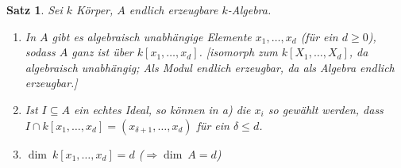 \documentclass[a4paper,12pt]{scrbook}
\theoremstyle{break}
\newtheorem{Satz}{Satz}
\theoremstyle{nonumberbreak}
\theoremstyle{nonumberplain}
\begin{document}
\begin{Satz}
\label{11}
Sei $k$ Körper, $A$ endlich erzeugbare $k$-Algebra.
\begin{enumerate}
\item In $A$ gibt es algebraisch unabhängige Elemente $x_1, \ldots, x_d$ (für ein
$d \geq 0$), sodass $A$ ganz ist über $k[x_1, \ldots, x_d]$. [isomorph zum 
$k[X_1,\ldots,X_d]$, da algebraisch unabhängig; Als Modul endlich erzeugbar,
da als Algebra endlich erzeugbar.]
\item Ist $I\subseteq A$ ein echtes Ideal, so können in a) die $x_i$ so
gewählt werden, dass $I\cap k[x_1, \ldots, x_d]=(x_{\delta+1},\ldots,x_d)$ für ein
$\delta \leq d$.
\item $\dim\ k[x_1, \ldots, x_d]=d$ ($\Rightarrow \dim\ A = d$)
\end{enumerate}
\end{Satz}
\end{document}
